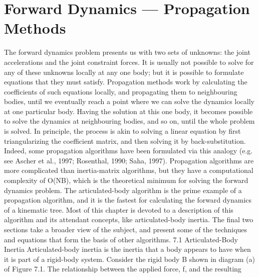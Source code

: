 \chapter{Forward Dynamics --- Propagation Methods}
\label{chap:7}
The forward dynamics problem presents us with two sets of unknowns: the joint accelerations and the joint constraint forces. It is usually not possible to solve for any of these unknowns locally at any one body; but it is possible to formulate equations that they must satisfy. Propagation methods work by calculating the coefficients of such equations locally, and propagating them to neighbouring bodies, until we eventually reach a point where we can solve the dynamics locally at one particular body. Having the solution at this one body, it becomes possible to solve the dynamics at neighbouring bodies, and so on, until the whole problem is solved. In principle, the process is akin to solving a linear equation by first triangularizing the coefficient matrix, and then solving it by back-substitution. Indeed, some propagation algorithms have been formulated via this analogy (e.g. see Ascher et al., 1997; Rosenthal, 1990; Saha, 1997). Propagation algorithms are more complicated than inertia-matrix algorithms, but they have a computational complexity of O(NB), which is the theoretical minimum for solving the forward dynamics problem. The articulated-body algorithm is the prime example of a propagation algorithm, and it is the fastest for calculating the forward dynamics of a kinematic tree. Most of this chapter is devoted to a description of this algorithm and its attendant concepts, like articulated-body inertia. The final two sections take a broader view of the subject, and present some of the techniques and equations that form the basis of other algorithms. 7.1 Articulated-Body Inertia Articulated-body inertia is the inertia that a body appears to have when it is part of a rigid-body system. Consider the rigid body B shown in diagram (a) of Figure 7.1. The relationship between the applied force, f, and the resulting

